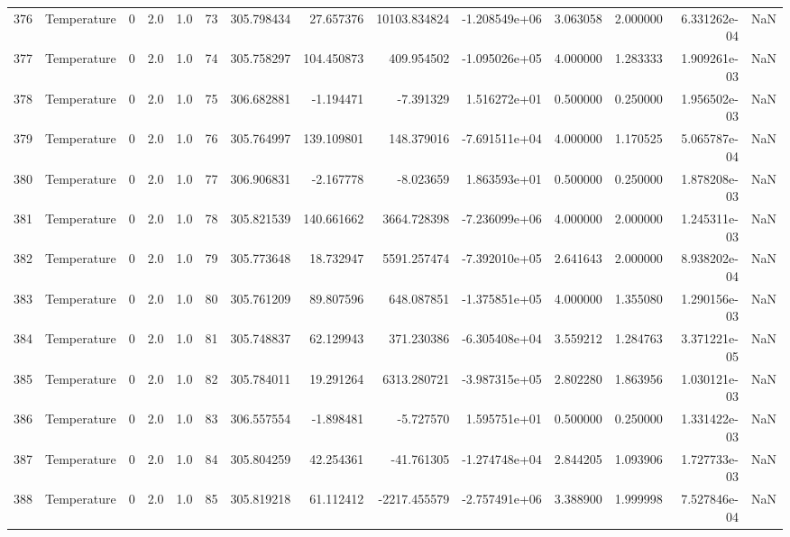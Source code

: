 \begin{tabular}{llrrrrrrrrrrrr}
376 &  Temperature &       0 &  2.0 &  1.0 &   73 &  305.798434 &    27.657376 &   10103.834824 & -1.208549e+06 &  3.063058 &  2.000000 &  6.331262e-04 &      NaN \\
377 &  Temperature &       0 &  2.0 &  1.0 &   74 &  305.758297 &   104.450873 &     409.954502 & -1.095026e+05 &  4.000000 &  1.283333 &  1.909261e-03 &      NaN \\
378 &  Temperature &       0 &  2.0 &  1.0 &   75 &  306.682881 &    -1.194471 &      -7.391329 &  1.516272e+01 &  0.500000 &  0.250000 &  1.956502e-03 &      NaN \\
379 &  Temperature &       0 &  2.0 &  1.0 &   76 &  305.764997 &   139.109801 &     148.379016 & -7.691511e+04 &  4.000000 &  1.170525 &  5.065787e-04 &      NaN \\
380 &  Temperature &       0 &  2.0 &  1.0 &   77 &  306.906831 &    -2.167778 &      -8.023659 &  1.863593e+01 &  0.500000 &  0.250000 &  1.878208e-03 &      NaN \\
381 &  Temperature &       0 &  2.0 &  1.0 &   78 &  305.821539 &   140.661662 &    3664.728398 & -7.236099e+06 &  4.000000 &  2.000000 &  1.245311e-03 &      NaN \\
382 &  Temperature &       0 &  2.0 &  1.0 &   79 &  305.773648 &    18.732947 &    5591.257474 & -7.392010e+05 &  2.641643 &  2.000000 &  8.938202e-04 &      NaN \\
383 &  Temperature &       0 &  2.0 &  1.0 &   80 &  305.761209 &    89.807596 &     648.087851 & -1.375851e+05 &  4.000000 &  1.355080 &  1.290156e-03 &      NaN \\
384 &  Temperature &       0 &  2.0 &  1.0 &   81 &  305.748837 &    62.129943 &     371.230386 & -6.305408e+04 &  3.559212 &  1.284763 &  3.371221e-05 &      NaN \\
385 &  Temperature &       0 &  2.0 &  1.0 &   82 &  305.784011 &    19.291264 &    6313.280721 & -3.987315e+05 &  2.802280 &  1.863956 &  1.030121e-03 &      NaN \\
386 &  Temperature &       0 &  2.0 &  1.0 &   83 &  306.557554 &    -1.898481 &      -5.727570 &  1.595751e+01 &  0.500000 &  0.250000 &  1.331422e-03 &      NaN \\
387 &  Temperature &       0 &  2.0 &  1.0 &   84 &  305.804259 &    42.254361 &     -41.761305 & -1.274748e+04 &  2.844205 &  1.093906 &  1.727733e-03 &      NaN \\
388 &  Temperature &       0 &  2.0 &  1.0 &   85 &  305.819218 &    61.112412 &   -2217.455579 & -2.757491e+06 &  3.388900 &  1.999998 &  7.527846e-04 &      NaN \\

\end{tabular}
